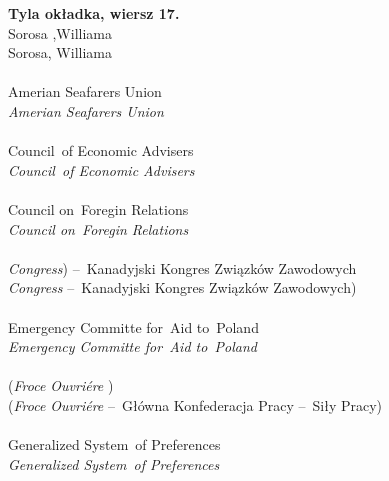 \documentclass[a4paper,11pt]{article}
\begin{document}
\begin{center}
\begin{tabular}{|c|c|c|c|c|}
    \hline
  \end{tabular}
\end{center}
\noi
\textbf{Tyla okładka, wiersz 17.} \\
\Jest Sorosa ,Williama \\
\Pow Sorosa, Williama \\
 \\
\Jest Amerian Seafarers Union \\
\Pow  \emph{Amerian Seafarers Union} \\
 \\
\Jest Council~of Economic Advisers \\
\Pow  \emph{Council~of Economic Advisers} \\
 \\
\Jest Council on~Foregin Relations \\
\Pow  \emph{Council on~Foregin Relations} \\
 \\
\Jest \emph{Congress}) --~Kanadyjski Kongres Związków Zawodowych \\
\Pow  \emph{Congress} --~Kanadyjski Kongres Związków Zawodowych) \\
 \\
\Jest Emergency Committe for~Aid to~Poland \\
\Pow  \emph{Emergency Committe for~Aid to~Poland} \\
 \\
\Jest (\emph{Froce Ouvri\'{e}re} ) \\
\Pow (\emph{Froce Ouvri\'{e}re} --~Główna Konfederacja Pracy --~Siły
Pracy) \\
 \\
\Jest Generalized System~of Preferences \\
\Pow  \emph{Generalized System~of Preferences} \\
\end{document}
